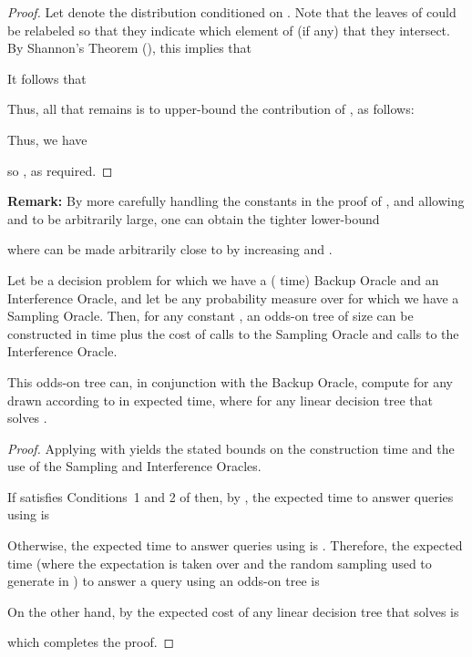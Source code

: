 \documentclass{patmorin}
\begin{document}
\begin{proof}
  Let  denote the distribution
   conditioned on .  Note that the leaves of
   could be relabeled so that they indicate which element of
   (if any) that they intersect.  By Shannon's Theorem
  (), this implies that
  
  It follows \cite[Lemma~3]{cdilm09} that
  
  Thus, all that remains is to upper-bound the contribution of
  ,
  as follows:
  
  Thus, we have 
  
  so , as required.
\end{proof}

\noindent\textbf{Remark:}  By more carefully handling the constants
in the proof of , and allowing  and  to be
arbitrarily large, one can obtain the tighter lower-bound

where  can be made arbitrarily close to  by increasing 
and .

\begin{thm}
  Let  be a decision problem for which we
  have a ( time) Backup Oracle and an Interference Oracle,
  and let  be any probability measure over  for which we have
  a Sampling Oracle.  Then, for any constant ,  an odds-on
  tree of size  can be constructed in  time
  plus the cost of  calls to the Sampling Oracle and
   calls to the Interference Oracle.

  This odds-on tree can, in conjunction with the Backup Oracle, compute
   for any  drawn according to  in 
  expected time, where  for any linear decision tree
   that solves .
\end{thm}

\begin{proof}
  Applying  with 
  yields the stated bounds on the construction time and the use of the
  Sampling and Interference Oracles.

  If  satisfies Conditions~1 and 2 of
   then, by , the expected
  time to answer queries using  is
  
  Otherwise, the expected time to answer queries using 
  is .  Therefore, the expected time (where the expectation
  is taken over  and the random sampling used to generate  in
  ) to answer a query using an odds-on tree is
  
  On the other hand, by  the expected cost of any
  linear decision tree  that solves  is
  
  which completes the proof.
\end{proof}
\end{document}
